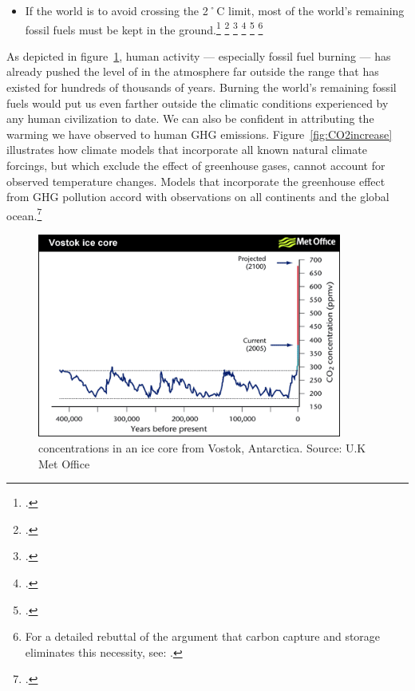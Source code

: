 \begin{itemize}
	\item If the world is to avoid crossing the 2˚C limit, most of the world's remaining fossil fuels must be kept in the ground.\footcite[][]{IEA2012} \footcite[][]{EconomistUnburnable} \footcite[][]{TerrifyingNewMath} \footcite[The Australian government's Climate Commission states that most fossil fuels must be left in the ground and cannot be burned ][p. 5]{CriticalDecade2013} \footcite[][]{ChallengeTwoDegrees} \footnote{For a detailed rebuttal of the argument that carbon capture and storage eliminates this necessity, see: .}
\end{itemize}


As depicted in figure~\ref{fig:Vostok}, human activity --- especially fossil fuel burning --- has already pushed the level of  in the atmosphere  far outside the range that has existed for hundreds of thousands of years. Burning the world's remaining fossil fuels would put us even farther outside the climatic conditions experienced by any human civilization to date.
We can also be confident in attributing the warming we have observed to human GHG emissions.
Figure~\ref{fig:CO2increase} illustrates how climate models that incorporate all known natural climate forcings, but which exclude the effect of greenhouse gases, cannot account for observed temperature changes. 
Models that incorporate the greenhouse effect from GHG pollution accord with observations on all continents and the global ocean.\footcite[][]{IPCC2007}



\begin{figure}
\includegraphics[width=100mm]{s2-co2increase.png}
\centering
\caption{ concentrations in an ice core from Vostok, Antarctica. Source: U.K Met Office}
\label{fig:Vostok}
\end{figure}



